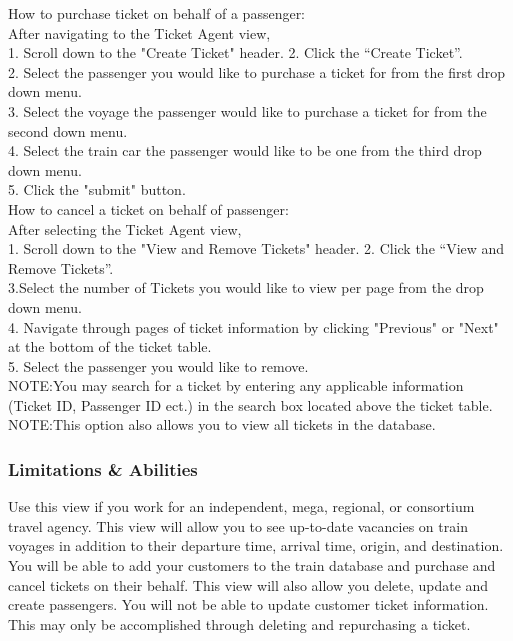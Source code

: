 \documentclass[letter]{article}
\begin{document}
How to purchase ticket on behalf of a passenger:\\
After navigating to the Ticket Agent view,\\ 
1. Scroll down to the "Create Ticket" header.
2. Click the “Create Ticket”.\\
2. Select the passenger you would like to purchase a ticket for from the first drop down menu.\\ 
3. Select the voyage the passenger would like to purchase a ticket for from the second down menu.\\
4. Select the train car the passenger would like to be one from the third drop down menu.\\ 
5. Click the "submit" button.\\ 


How to cancel a ticket on behalf of passenger:\\
After selecting the Ticket Agent view,\\
1. Scroll down to the "View and Remove Tickets" header.
2. Click the “View and Remove Tickets”.\\
3.Select the number of Tickets you would like to view per page from the drop down menu.\\
4. Navigate through pages of ticket information by clicking "Previous" or "Next" at the bottom of the ticket table.\\
5. Select the passenger you would like to remove. \\
NOTE:You may search for a ticket by entering any applicable information (Ticket ID, Passenger ID ect.) in the search box located above the ticket table.
NOTE:This option also allows you to view all tickets in the database.\\




\subsubsection{Limitations \& Abilities}
Use this view if you work for an independent, mega, regional, or consortium travel agency. This view will allow you to see up-to-date vacancies on train voyages in addition to their departure time, arrival time, origin, and destination. You will be able to add your customers to the train database and purchase and cancel tickets on their behalf. This view will also allow you delete, update and create passengers. You will not be able to update customer ticket information. This may only be accomplished through deleting and repurchasing a ticket. 
\end{document}
